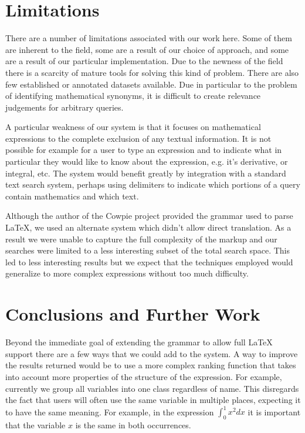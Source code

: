 \documentclass{sig-alternate}
\begin{document}
\section{Limitations}
There are a number of limitations associated with our work here. Some of them are inherent to the field,
some are a result of our choice of approach, and some are a result of our particular implementation. Due to the newness
of the field there is a scarcity of mature tools for solving this kind of problem. There are also few 
established or annotated datasets available. Due in particular to the problem of identifying mathematical
synonyms, it is difficult to create relevance judgements for arbitrary queries. 

A particular weakness of our system is that it focuses on mathematical expressions to the complete exclusion
of any textual information. It is not possible for example for a user to type an expression and to indicate what
in particular they would like to know about the expression, e.g. it's derivative, or integral, etc. The system would benefit greatly by integration with a standard text search system, perhaps using delimiters to indicate which portions
of a query contain mathematics and which text.

Although the author of the Cowpie project provided the grammar used to parse \LaTeX{}, we used an alternate system
which didn't allow direct translation. As a result we were unable to capture the full complexity of the markup and 
our searches were limited to a less interesting subset of the total search space. This led to less interesting results
but we expect that the techniques employed would generalize to more complex expressions without too much difficulty.

\section{Conclusions and Further Work}
Beyond the immediate goal of extending the grammar to allow full \LaTeX{} support there are a few ways that we could 
add to the system. A way to improve the results returned would be to use a more complex ranking function that takes into
account more properties of the structure of the expression. For example, currently we group all variables into one
class regardless of name. This disregards the fact that users will often use the same variable in multiple places, 
expecting it to have the same meaning. For example, in the expression $\int_{0}^{1}x^{2} dx$ it is important that
the variable $x$ is the same in both occurrences. 
\end{document}
